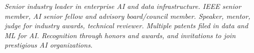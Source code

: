 {\selectfont
	\begin{justify}\textit{Senior industry leader in enterprise AI and data infrastructure. IEEE senior member, AI senior fellow and advisory board/council member. Speaker, mentor, judge for industry awards, technical reviewer. Multiple patents filed in data and ML for AI. Recognition through honors and awards, and invitations to join prestigious AI organizations.}\end{justify}
}